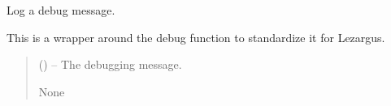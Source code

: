 \documentclass[letterpaper,11pt,english]{sphinxmanual}
\begin{document}

\begin{savenotes}\begin{fulllineitems}
\label{\detokenize{code/lezargus.library.logging:lezargus.library.logging.debug}}
\pysigstartsignatures
{}
\pysigstopsignatures
\sphinxAtStartPar
Log a debug message.

\sphinxAtStartPar
This is a wrapper around the debug function to standardize it for Lezargus.
\begin{quote}\begin{description}
\sphinxAtStartPar
{} () – The debugging message.

\sphinxAtStartPar
None

\end{description}\end{quote}

\end{fulllineitems}\end{savenotes}

\end{document}
